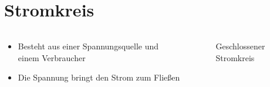
\section{Stromkreis}
\label{section:stromkreis}
\begin{frame}%

\begin{columns}
    \begin{column}{0.48\textwidth}
    \begin{itemize}
  \item Besteht aus einer Spannungsquelle und einem Verbraucher
  \item Die Spannung bringt den Strom zum Fließen
  \end{itemize}

    \end{column}
   \begin{column}{0.48\textwidth}
       
\begin{figure}
    \caption{\scriptsize Geschlossener Stromkreis}
    \label{n_stromkreis_geschlossen}
\end{figure}


   \end{column}
\end{columns}

\end{frame}

